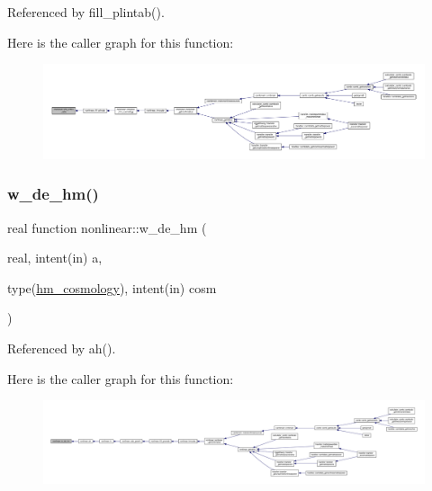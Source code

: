 Referenced by fill\+\_\+plintab().

Here is the caller graph for this function\+:
\nopagebreak
\begin{figure}[H]
\begin{center}
\leavevmode
\includegraphics[width=350pt]{namespacenonlinear_a71f404d2d1de4ad126d2e43eea191621_icgraph}
\end{center}
\end{figure}
\mbox{\label{namespacenonlinear_acb781fcdfe31fdfcd54337c5fc827fb2}} 
\subsubsection{\texorpdfstring{w\+\_\+de\+\_\+hm()}{w\_de\_hm()}}
{\footnotesize\ttfamily real function nonlinear\+::w\+\_\+de\+\_\+hm (\begin{DoxyParamCaption}\item[{real, intent(in)}]{a,  }\item[{type(\mbox{\hyperlink{structnonlinear_1_1hm__cosmology}{hm\+\_\+cosmology}}), intent(in)}]{cosm }\end{DoxyParamCaption})\hspace{0.3cm}{\ttfamily [private]}}



Referenced by ah().

Here is the caller graph for this function\+:
\nopagebreak
\begin{figure}[H]
\begin{center}
\leavevmode
\includegraphics[width=350pt]{namespacenonlinear_acb781fcdfe31fdfcd54337c5fc827fb2_icgraph}
\end{center}
\end{figure}
\mbox{\label{namespacenonlinear_a35d90b214ebbc4ed47ee2a0b00533081}} 
